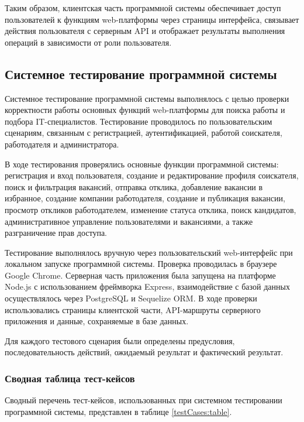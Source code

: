 Таким образом, клиентская часть программной системы обеспечивает доступ пользователей к функциям web-платформы через страницы интерфейса, связывает действия пользователя с серверным API и отображает результаты выполнения операций в зависимости от роли пользователя.

\subsection{Системное тестирование программной системы}

Системное тестирование программной системы выполнялось с целью проверки корректности работы основных функций web-платформы для поиска работы и подбора IT-специалистов. Тестирование проводилось по пользовательским сценариям, связанным с регистрацией, аутентификацией, работой соискателя, работодателя и администратора.

В ходе тестирования проверялись основные функции программной системы: регистрация и вход пользователя, создание и редактирование профиля соискателя, поиск и фильтрация вакансий, отправка отклика, добавление вакансии в избранное, создание компании работодателя, создание и публикация вакансии, просмотр откликов работодателем, изменение статуса отклика, поиск кандидатов, административное управление пользователями и вакансиями, а также разграничение прав доступа.

Тестирование выполнялось вручную через пользовательский web-интерфейс при локальном запуске программной системы. Проверка проводилась в браузере Google Chrome. Серверная часть приложения была запущена на платформе Node.js с использованием фреймворка Express, взаимодействие с базой данных осуществлялось через PostgreSQL и Sequelize ORM. В ходе проверки использовались страницы клиентской части, API-маршруты серверного приложения и данные, сохраняемые в базе данных.

Для каждого тестового сценария были определены предусловия, последовательность действий, ожидаемый результат и фактический результат.


\subsubsection{Сводная таблица тест-кейсов}

Сводный перечень тест-кейсов, использованных при системном тестировании программной системы, представлен в таблице \ref{testCases:table}.


